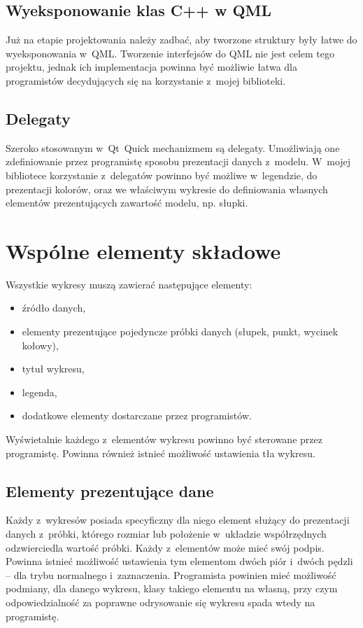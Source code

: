 \subsection{Wyeksponowanie klas C++ w QML}
Już na etapie projektowania należy zadbać, aby tworzone struktury były łatwe do wyeksponowania w~QML. 
Tworzenie interfejsów do QML nie jest celem tego projektu, jednak ich implementacja powinna być możliwie łatwa dla programistów decydujących się na korzystanie z~mojej biblioteki.

\subsection{Delegaty}
Szeroko stosowanym w~Qt~Quick mechanizmem są delegaty. Umożliwiają one zdefiniowanie przez programistę sposobu prezentacji danych z~modelu. W~mojej bibliotece korzystanie z~delegatów powinno być możliwe w~legendzie, do prezentacji kolorów, oraz we właściwym wykresie do definiowania własnych elementów prezentujących zawartość modelu, np. słupki.


\section{Wspólne elementy składowe}
Wszystkie wykresy muszą zawierać następujące elementy:
\begin{itemize}
\item{źródło danych,}
\item{elementy prezentujące pojedyncze próbki danych (słupek, punkt, wycinek kołowy),}
\item{tytuł wykresu,}
\item{legenda,}
\item{dodatkowe elementy dostarczane przez programistów.}
\end{itemize}

Wyświetalnie każdego z~elementów wykresu powinno być sterowane przez programistę. Powinna również istnieć możliwość ustawienia tła wykresu.

 
\subsection{Elementy prezentujące dane}
Każdy z~wykresów posiada specyficzny dla niego element służący do prezentacji danych z~próbki, którego rozmiar lub położenie w~układzie współrzędnych odzwierciedla wartość próbki. Każdy z~elementów może mieć swój podpis. Powinna istnieć możliwość ustawienia tym elementom dwóch piór i~dwóch pędzli -- dla trybu normalnego i~zaznaczenia. Programista powinien mieć możliwość podmiany, dla danego wykresu, klasy takiego elementu na własną, przy czym odpowiedzialność za poprawne odrysowanie się wykresu spada wtedy na programistę.

